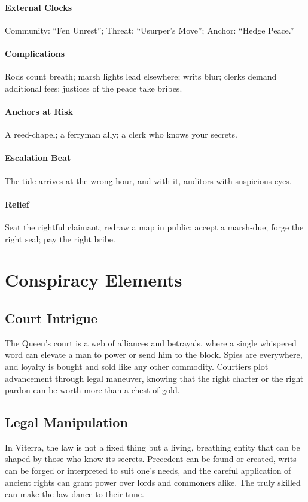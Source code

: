 \paragraph{External Clocks} Community: ``Fen Unrest''; Threat: ``Usurper's Move''; Anchor: ``Hedge Peace.''
\paragraph{Complications} Rods count breath; marsh lights lead elsewhere; writs blur; clerks demand additional fees; justices of the peace take bribes.
\paragraph{Anchors at Risk} A reed-chapel; a ferryman ally; a clerk who knows your secrets.
\paragraph{Escalation Beat} The tide arrives at the wrong hour, and with it, auditors with suspicious eyes.
\paragraph{Relief} Seat the rightful claimant; redraw a map in public; accept a marsh-due; forge the right seal; pay the right bribe.

\section*{Conspiracy Elements}

\subsection*{Court Intrigue}
The Queen's court is a web of alliances and betrayals, where a single whispered word can elevate a man to power or send him to the block. Spies are everywhere, and loyalty is bought and sold like any other commodity. Courtiers plot advancement through legal maneuver, knowing that the right charter or the right pardon can be worth more than a chest of gold.

\subsection*{Legal Manipulation}
In Viterra, the law is not a fixed thing but a living, breathing entity that can be shaped by those who know its secrets. Precedent can be found or created, writs can be forged or interpreted to suit one's needs, and the careful application of ancient rights can grant power over lords and commoners alike. The truly skilled can make the law dance to their tune.

